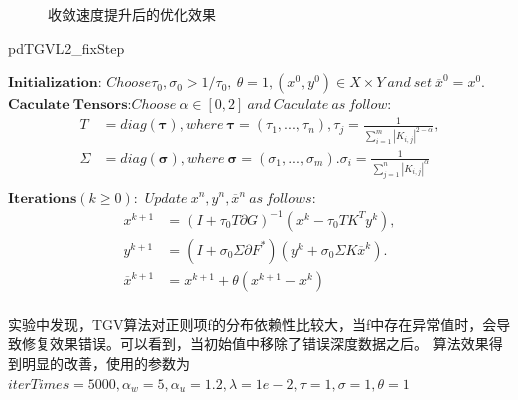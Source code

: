\documentclass[UTF8]{ctexart}
\begin{document}
\begin{sloppypar}
\begin{figure}[htbp]
            \quad
            \caption{\small 收敛速度提升后的优化效果}
            \label{fig:fasttgv}
        \end{figure}
        \begin{algorithm}
            \caption{pdTGVL2\_fixStep}
            \begin{algorithmic}
                \STATE $\bm{Initialization}$: $Choose \tau_0,\sigma_0 > 1/ \tau_0, \ \theta = 1, (x^0,y^0)\in X\times Y \ and \ set\ \overline{x}^0=x^0.$
                \STATE $\bm{Caculate\ Tensors}$:$Choose\ \alpha \in[0,2]\ and\ Caculate\ as\ follow:$
                \begin{equation}
                    \begin{aligned}
                        T &= diag(\bm{\tau}) , where\ \bm{\tau} = (\tau_1,...,\tau_n),\tau_j=\frac{1}{\sum_{i=1}^m\left| K_{i,j} \right|^{2-\alpha}},\\
                        \Sigma &= diag(\bm{\sigma}),where\ \bm{\sigma} = (\sigma_1,...,\sigma_m).\sigma_i=\frac{1}{\sum_{j=1}^n\left| K_{i,j} \right|^{\alpha}}\\
                    \end{aligned}
                \end{equation}
                \STATE $\bm{Iterations}(k\geq 0)$:\ $Update\ x^n,y^n,\overline{x}^n\ as\ follows:$
                \begin{equation}
                    \begin{aligned}
                        x^{k+1} &=(I+\tau_0 T\partial G)^{-1}(x^k-\tau_0 TK^Ty^k ), \\
                        y^{k+1} &=(I+\sigma_0\Sigma\partial F^*)(y^k+\sigma_0 \Sigma K\overline{x}^k).\\
                        \overline{x}^{k+1} &= x^{k+1}+\theta(x^{k+1}-x^k)\\
                    \end{aligned}
                \end{equation}
            \end{algorithmic}
            \label{alg:TGVL2Fixstep}
        \end{algorithm}
        实验中发现，TGV算法对正则项f的分布依赖性比较大，当f中存在异常值时，会导致修复效果错误。可以看到，当初始值中移除了错误深度数据之后。
        算法效果得到明显的改善，使用的参数为$iterTimes = 5000, \alpha_w = 5, \alpha_u=1.2, \lambda = 1e-2,\tau = 1, \sigma = 1, \theta = 1$


\end{sloppypar}
\end{document}
